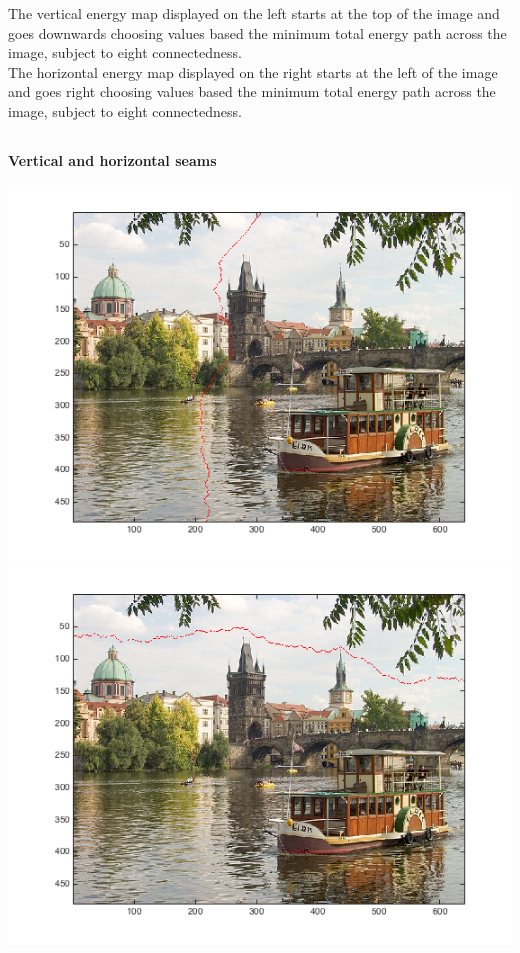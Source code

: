 \documentclass[11pt]{amsart}
\begin{document}
\begin{center}
The vertical energy map displayed on the left starts at the top of the image and goes downwards choosing values based the minimum total energy path across the image, subject to eight connectedness. \\

The horizontal energy map displayed on the right starts at the left of the image and goes right choosing values based the minimum total energy path across the image, subject to eight connectedness. \\

\end{center}

\subsection{}
\textbf{Vertical and horizontal seams} \\
\begin{center}
\includegraphics[scale=0.40]{verticalSeamPrague.png}
\includegraphics[scale=0.40]{horizontalSeamPrague.png}
\end{center}
\end{document}
